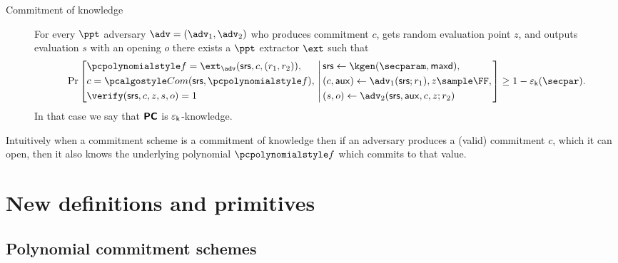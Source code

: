 \documentclass[runningheads,11pt]{llncs}
\begin{document}
\begin{description}
\item[Commitment of knowledge] For every $\ppt$ adversary
  $\adv = (\adv_1, \adv_2)$ who produces commitment $c$, gets random evaluation
  point $z$, and outputs evaluation $s$ with an opening $o$ there exists a
  $\ppt$ extractor $\ext$ such that
\[
  \Pr \left[
    \begin{aligned}
      & \p{f} = \ext_\adv(\srs, c, (r_1, r_2)),\\
      & c = \com(\srs, \p{f}),\\
      & \verify(\srs, c, z, s, o) = 1
    \end{aligned}
    \,\left|\,
      \vphantom{
        \begin{aligned}
          & \\
          & \\
          &
        \end{aligned}
        }
    \begin{aligned}
      & \srs \gets \kgen(\secparam, \maxdeg),\\
      & (c, \aux) \gets \adv_1(\srs; r_1), z \sample \FF, \\
      &  (s, o) \gets \adv_2(\srs, \aux, c, z; r_2)
    \end{aligned}
  \right.\right]
  \geq 1 - \epsk(\secpar).
\]
In that case we say that $\bm{\mathsf{PC}}$ is $\varepsilon_{\mathsf{k}}$-knowledge.
\end{description}
Intuitively when a commitment scheme is a commitment of knowledge then if an
adversary produces a (valid) commitment $c$, which it can open, then it also
knows the underlying polynomial $\p{f}$ which commits to that value.

\section{New definitions and primitives}
\subsection{Polynomial commitment schemes}
\end{document}
